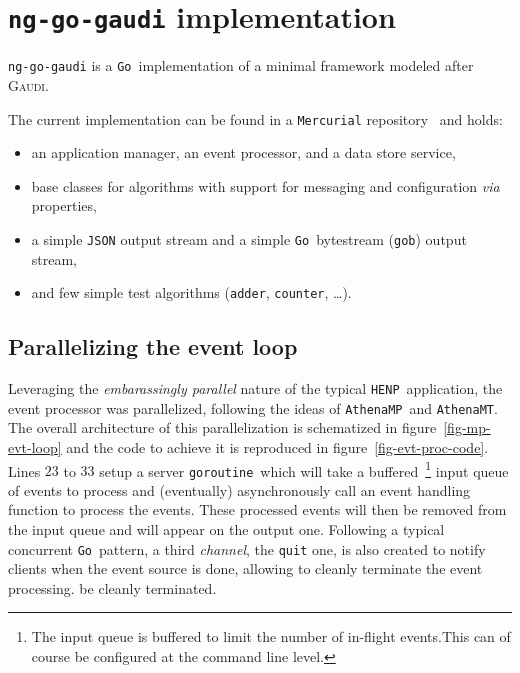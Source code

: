 \documentclass[a4paper]{jpconf}
\newcommand{\athenamp}{\texttt{AthenaMP}}
\newcommand{\athenamt}{\texttt{AthenaMT}}
\newcommand{\gaudi}{\textsc{Gaudi}}
\newcommand{\golang}{\texttt{Go}}
\newcommand{\henp}{\texttt{HENP}}
\newcommand{\goroutine}{\texttt{goroutine}}
\begin{document}
\section{\texttt{ng-go-gaudi} implementation}
\texttt{ng-go-gaudi} is a \golang\ implementation of a minimal
framework modeled after \gaudi.

The current implementation can be found in a \verb'Mercurial'
repository~\cite{ref-ng-go} and holds:

\begin{itemize}
  \item an application manager, an event processor, and a data store
    service, 
  \item base classes for algorithms with support for messaging and
    configuration \emph{via} properties,
  \item a simple \texttt{JSON} output stream and a simple
    \golang\ bytestream (\texttt{gob}) output stream, 
  \item and few simple test algorithms (\texttt{adder},
    \texttt{counter}, \ldots).
\end{itemize}
 
\subsection{Parallelizing the event loop}
Leveraging the \emph{embarassingly parallel} nature of the typical
\henp\ application, the event processor was parallelized, following
the ideas of \athenamp\ and \athenamt.
The overall architecture of this parallelization is schematized in
figure~\ref{fig-mp-evt-loop} and the code to achieve it is reproduced
in figure~\ref{fig-evt-proc-code}.
Lines $23$ to $33$ setup a server \goroutine\ which will take a
buffered~\footnote{The input queue is buffered to limit the number of
  in-flight events.This can of course be configured at the command
  line level.} input queue of events to process and (eventually)
asynchronously call an event handling function to process the events. 
These processed events will then be removed from the input queue and
will appear on the output one.
Following a typical concurrent \golang\ pattern, a third
\emph{channel}, the \texttt{quit} one, is also created to notify
clients when the event source is done, allowing to cleanly terminate the event processing.
be cleanly terminated.
\end{document}
